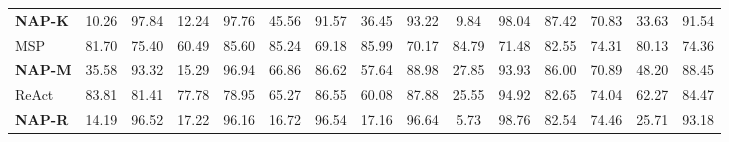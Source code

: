 \begin{table}[!h]
{\begin{tabular}{LcccccccccccccR}
\textbf{NAP-K}            & 10.26                       & 97.84                      & 12.24                      & 97.76                      & 45.56                       & 91.57                      & 36.45                       & 93.22                      & 9.84                       & 98.04                      & 87.42                      & 70.83                      & 33.63                       & 91.54                      \\ %
MSP                         & 81.70                      & 75.40                      & 60.49                      & 85.60                      & 85.24                      & 69.18                      & 85.99                       & 70.17                      & 84.79                      & 71.48                      & 82.55                      & 74.31                      & 80.13                      & 74.36                      \\
\textbf{NAP-M}            & 35.58                       &    93.32                   & 15.29                      & 96.94                      & 66.86                       & 86.62                      & 57.64                       & 88.98                      & 27.85                       & 93.93                      & 86.00                      & 70.89                      & 48.20                       & 88.45                      \\ %
ReAct                                                 & 83.81                     & 81.41                     & 77.78                     & 78.95                     & 65.27                     & 86.55                     & 60.08                     & 87.88                     & 25.55                     & 94.92                     & 82.65                     & 74.04                     & 62.27                     & 84.47                     \\
\textbf{NAP-R}                                 & 14.19                     & 96.52                     & 17.22                     & 96.16                     & 16.72                     & 96.54                     & 17.16                     & 96.64                     & 5.73                      & 98.76                     & 82.54                     & 74.46                     & 25.71                     & 93.18                     \\ \bottomrule
\end{tabular}
}
\end{table}
